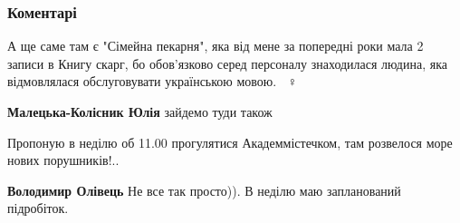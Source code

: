  
 
 
 
 
\subsubsection{Коментарі}
\label{sec:28_07_2021.fb.ukrainska_dija.1.kiev_mova_zakon.cmt}

\begin{itemize}
 

А ще саме там є "Сімейна пекарня", яка від мене за попередні роки мала 2 записи
в Книгу скарг, бо обов'язково серед персоналу знаходилася людина, яка
відмовлялася обслуговувати українською мовою. 🤷🏻♀️

\begin{itemize}
 
\textbf{Малецька-Колісник Юлія} зайдемо туди також

 
Пропоную в неділю об 11.00 прогулятися Академмістечком, там розвелося море нових порушників!..

\begin{itemize}
 
\textbf{Володимир Олівець} Не все так просто)). В неділю маю запланований підробіток.


\end{itemize}
\end{itemize}
\end{itemize}

